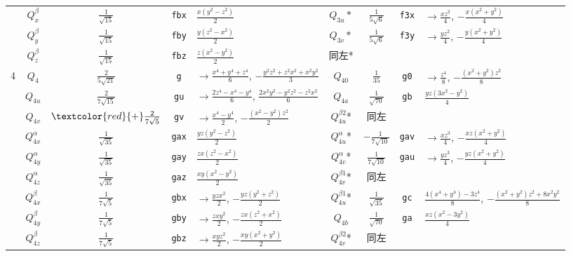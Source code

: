 \documentclass[11pt]{easymemo}
\begin{document}
\begin{table}[ht!]
\begin{center}
\begin{tabular}{c||c|c|c|l||c|c|c|l}
  & $Q_x^\beta$ & $\frac{1}{\sqrt{15}}$ & \texttt{fbx} & $ \frac{x(y^2-z^2)}{2}$ &
$Q_{3u}*$ & $\frac{1}{5\sqrt{6}}$ & \texttt{f3x} & $\to\frac{xz^2}{4}$, $-\frac{x(x^2+y^2)}{4}$ \\
  & $Q_y^\beta$ & $\frac{1}{\sqrt{15}}$ & \texttt{fby} & $ \frac{y(z^2-x^2)}{2}$ &
$Q_{3v}*$ & $\frac{1}{5\sqrt{6}}$ & \texttt{f3y} & $\to\frac{yz^2}{4}$, $-\frac{y(x^2+y^2)}{4}$ \\
  & $Q_z^\beta$ & $\frac{1}{\sqrt{15}}$ & \texttt{fbz} & $ \frac{z(x^2-y^2)}{2}$ & 同左* & & & \\
 \hline
4 & $Q_4$ & $\frac{2}{5\sqrt{21}}$ & \texttt{g} & $\to\frac{x^{4}+y^4+z^4}{6}$, $-\frac{y^2z^2+z^2x^2+x^2y^2}{3}$ &
$Q_{40}$ & $\frac{1}{35}$ & \texttt{g0} & $\to\frac{z^4}{8}$, $-\frac{(x^2+y^2)z^2}{8}$ \\
  & $Q_{4u}$ & $\frac{2}{7\sqrt{15}}$ & \texttt{gu} & $\to\frac{2z^4-x^4-y^4}{6}$, $\frac{2x^2y^2-y^2z^2-z^2x^2}{6}$ &
$Q_{4a}$ & $\frac{1}{\sqrt{70}}$ & \texttt{gb} & $\frac{yz(3x^{2}-y^{2})}{4}$ \\
  & $Q_{4v}$ & $\textcolor{red}{+}\frac{2}{7\sqrt{5}}$ & \texttt{gv} & $\to\frac{x^4-y^4}{2}$, $-\frac{(x^2-y^2)z^2}{2}$ &
$Q_{4u}^{\beta2}$* & 同左 & & \\
  & $Q_{4x}^\alpha$ & $\frac{1}{\sqrt{35}}$ & \texttt{gax} & $ \frac{yz(y^2-z^2)}{2} $ &
$Q_{4u}^\alpha$* & $-\frac{1}{7\sqrt{10}}$ & \texttt{gav} & $\to\frac{xz^3}{4}$, $-\frac{xz(x^2+y^2)}{4}$ \\
  &$ Q_{4y}^\alpha$ & $\frac{1}{\sqrt{35}}$ & \texttt{gay} & $\frac{zx(z^2-x^2)}{2} $ &
$Q_{4v}^\alpha$* & $\frac{1}{7\sqrt{10}}$ & \texttt{gau} & $\to\frac{yz^3}{4}$, $-\frac{yz(x^2+y^2)}{4}$ \\
  & $Q_{4z}^\alpha$ & $\frac{1}{\sqrt{35}}$ & \texttt{gaz} & $\frac{xy(x^2-y^2)}{2} $ &
$Q_{4v}^{\beta1}$* & 同左 & & \\
  & $Q_{4x}^\beta$ & $\frac{1}{7\sqrt{5}}$ & \texttt{gbx} & $\to\frac{yzx^2}{2}$, $-\frac{yz(y^2+z^2)}{2}$ &
$Q_{4u}^{\beta1}$* & $\frac{1}{\sqrt{35}}$ & \texttt{gc} & $\frac{4(x^4+y^4)-3z^4}{8}$, $-\frac{(x^2+y^2)z^2+8x^2y^2}{8}$ \\
  & $Q_{4y}^\beta$ & $\frac{1}{7\sqrt{5}}$ & \texttt{gby} & $\to\frac{zxy^2}{2}$, $-\frac{zx(z^2+x^2)}{2}$ &
$Q_{4b}$ & $\frac{1}{\sqrt{70}}$ & \texttt{ga} & $\frac{xz(x^{2}-3y^{2})}{4}$ \\
  & $Q_{4z}^\beta$ & $\frac{1}{7\sqrt{5}}$ & \texttt{gbz} & $\to\frac{xyz^2}{2}$, $-\frac{xy(x^2+y^2)}{2}$ &
$Q_{4v}^{\beta2}$* & 同左 & & \\
 \hline \hline
\end{tabular}
\end{center}
\end{table}
\end{document}
